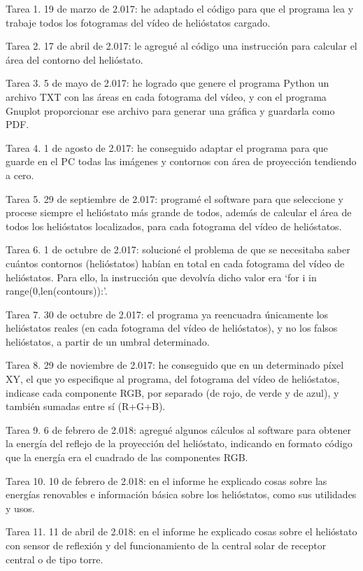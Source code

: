 Tarea 1. 19 de marzo de 2.017: he adaptado el código para que el programa lea y trabaje todos los fotogramas del vídeo de helióstatos cargado.

Tarea 2. 17 de abril de 2.017: le agregué al código una instrucción para calcular el área del contorno del helióstato.

Tarea 3. 5 de mayo de 2.017: he logrado que genere el programa Python un archivo TXT con las áreas en cada fotograma del vídeo, y con el programa Gnuplot proporcionar ese archivo para generar una gráfica y guardarla como PDF.

Tarea 4. 1 de agosto de 2.017: he conseguido adaptar el programa para que guarde en el PC todas las imágenes y contornos con área de proyección tendiendo a cero.

Tarea 5. 29 de septiembre de 2.017: programé el software para que seleccione y procese siempre el helióstato más grande de todos, además de calcular el área de todos los helióstatos localizados, para cada fotograma del vídeo de helióstatos.

Tarea 6. 1 de octubre de 2.017: solucioné el problema de que se necesitaba saber cuántos contornos (helióstatos) habían en total en cada fotograma del vídeo de helióstatos. Para ello, la instrucción que devolvía dicho valor era ‘for i in range(0,len(contours)):’.

Tarea 7. 30 de octubre de 2.017: el programa ya reencuadra únicamente los helióstatos reales (en cada fotograma del vídeo de helióstatos), y no los falsos helióstatos, a partir de un umbral determinado.

Tarea 8. 29 de noviembre de 2.017: he conseguido que en un determinado píxel XY, el que yo especifique al programa, del fotograma del vídeo de helióstatos, indicase cada componente RGB, por separado (de rojo, de verde y de azul), y también sumadas entre sí (R+G+B).

Tarea 9. 6 de febrero de 2.018: agregué algunos cálculos al software para obtener la energía del reflejo de la proyección del helióstato, indicando en formato código que la energía era el cuadrado de las componentes RGB.

Tarea 10. 10 de febrero de 2.018: en el informe he explicado cosas sobre las energías renovables e información básica sobre los helióstatos, como sus utilidades y usos.

Tarea 11. 11 de abril de 2.018: en el informe he explicado cosas sobre el helióstato con sensor de reflexión y del funcionamiento de la central solar de receptor central o de tipo torre.

